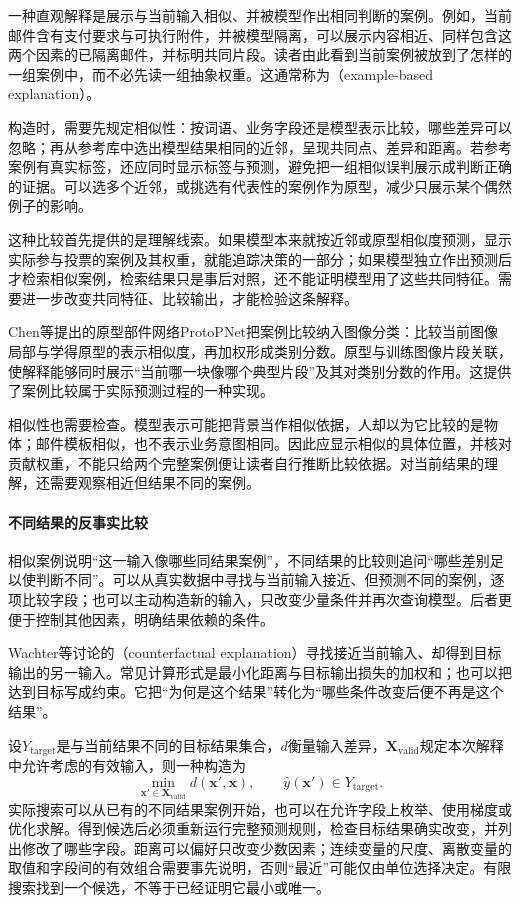 一种直观解释是展示与当前输入相似、并被模型作出相同判断的案例。例如，当前邮件含有支付要求与可执行附件，并被模型隔离，可以展示内容相近、同样包含这两个因素的已隔离邮件，并标明共同片段。读者由此看到当前案例被放到了怎样的一组案例中，而不必先读一组抽象权重。这通常称为（example-based explanation）。

构造时，需要先规定相似性：按词语、业务字段还是模型表示比较，哪些差异可以忽略；再从参考库中选出模型结果相同的近邻，呈现共同点、差异和距离。若参考案例有真实标签，还应同时显示标签与预测，避免把一组相似误判展示成判断正确的证据。可以选多个近邻，或挑选有代表性的案例作为原型，减少只展示某个偶然例子的影响。

这种比较首先提供的是理解线索。如果模型本来就按近邻或原型相似度预测，显示实际参与投票的案例及其权重，就能追踪决策的一部分；如果模型独立作出预测后才检索相似案例，检索结果只是事后对照，还不能证明模型用了这些共同特征。需要进一步改变共同特征、比较输出，才能检验这条解释。

Chen等提出的原型部件网络ProtoPNet把案例比较纳入图像分类：比较当前图像局部与学得原型的表示相似度，再加权形成类别分数。原型与训练图像片段关联，使解释能够同时展示“当前哪一块像哪个典型片段”及其对类别分数的作用。这提供了案例比较属于实际预测过程的一种实现。

相似性也需要检查。模型表示可能把背景当作相似依据，人却以为它比较的是物体；邮件模板相似，也不表示业务意图相同。因此应显示相似的具体位置，并核对贡献权重，不能只给两个完整案例便让读者自行推断比较依据。对当前结果的理解，还需要观察相近但结果不同的案例。

\paragraph{不同结果的反事实比较}
\label{sec:interpretability-local-counterfactual}

相似案例说明“这一输入像哪些同结果案例”，不同结果的比较则追问“哪些差别足以使判断不同”。可以从真实数据中寻找与当前输入接近、但预测不同的案例，逐项比较字段；也可以主动构造新的输入，只改变少量条件并再次查询模型。后者更便于控制其他因素，明确结果依赖的条件。

Wachter等讨论的（counterfactual explanation）寻找接近当前输入、却得到目标输出的另一输入。常见计算形式是最小化距离与目标输出损失的加权和；也可以把达到目标写成约束。它把“为何是这个结果”转化为“哪些条件改变后便不再是这个结果”。

设$Y_{\mathrm{target}}$是与当前结果不同的目标结果集合，$d$衡量输入差异，$\bm X_{\mathrm{valid}}$规定本次解释中允许考虑的有效输入，则一种构造为
\begin{equation}
 \min_{\bm{x}'\in\bm X_{\mathrm{valid}}}
 d(\bm{x}',\bm{x}),
 \qquad \hat y(\bm{x}')\in Y_{\mathrm{target}}.
 \label{eq:interpretability-counterfactual}
\end{equation}
实际搜索可以从已有的不同结果案例开始，也可以在允许字段上枚举、使用梯度或优化求解。得到候选后必须重新运行完整预测规则，检查目标结果确实改变，并列出修改了哪些字段。距离可以偏好只改变少数因素；连续变量的尺度、离散变量的取值和字段间的有效组合需要事先说明，否则“最近”可能仅由单位选择决定。有限搜索找到一个候选，不等于已经证明它最小或唯一。

